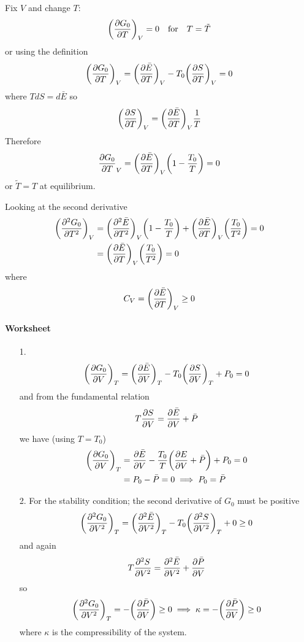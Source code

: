 \documentclass[../main.tex]{subfiles}
\begin{document}
Fix $V$ and change $T$:
\begin{align*}
    \qt(\pdv{G_0}{T})_V = 0 \qqtext{for} T = \tilde T
\end{align*}
or using the definition
\begin{align*}
    \qt(\pdv{G_0}{T})_V = \qt(\pdv{\bar E}{T})_V - T_0 \qt(\pdv{S}{T})_V = 0
\end{align*}
where $T dS = d\bar E$ so
\begin{align*}
    \qt(\pdv{S}{T})_V = \qt(\pdv{\bar E}{T})_V \frac{1}{T}
\end{align*}
Therefore
\begin{align*}
    \pdv{G_0}{T}_V = \qt(\pdv{\bar E}{T})_V \qt(1 - \frac{T_0}{T}) = 0
\end{align*}
or $\tilde T = T$ at equilibrium.

Looking at the second derivative
\begin{align*}
    \qt(\pdv[2]{G_0}{T})_V &= \qt(\pdv[2]{\bar E}{T})_V \qt(1 - \frac{T_0}{T}) + \qt(\pdv{\bar E }{T})_V \qt(\frac{T_0}{T^2}) = 0 \\
    &= \qt(\pdv{\bar E }{T})_V \qt(\frac{T_0}{T^2}) = 0
\end{align*}
where
\begin{align*}
    C_V = \qt(\pdv{\bar E}{T})_V \geq 0
\end{align*}

\paragraph{Worksheet}
\begin{itemize}
    \item [1.]
    \begin{align*}
        \qt(\pdv{G_0}{V})_T = \qt(\pdv{\bar E}{V})_T - T_0 \qt(\pdv{S}{V})_T + P_0 = 0
    \end{align*}
    and from the fundamental relation
    \begin{align*}
        T \pdv{S}{V} = \pdv{\bar E}{V} + \bar P
    \end{align*}
    we have (using $T = T_0$)
    \begin{align*}
        \qt(\pdv{G_0}{V})_T &= \pdv{\bar E}{V} - \frac{T_0}{T} \qt(\pdv{E}{V} + \bar P) + P_0 = 0 \\
        &= P_0 - \bar P = 0 \implies P_0 = \bar P
    \end{align*}
    \item [2.] For the stability condition; the second derivative of $G_0$ must be positive
    \begin{align*}
        \qt(\pdv[2]{G_0}{V})_T = \qt(\pdv[2]{\bar E}{V})_T - T_0 \qt(\pdv[2]{S}{V})_T + 0 \geq 0
    \end{align*}
    and again
    \begin{align*}
        T \pdv[2]{S}{V} = \pdv[2]{\bar E}{V} + \pdv{\bar P}{V}
    \end{align*}
    so
    \begin{align*}
        \qt(\pdv[2]{G_0}{V})_T = -\qt(\pdv{\bar P}{V}) \geq 0 \implies \kappa = -\qt(\pdv{\bar P}{V}) \geq 0
    \end{align*}
    where $\kappa$ is the compressibility of the system.
\end{itemize}
\end{document}
